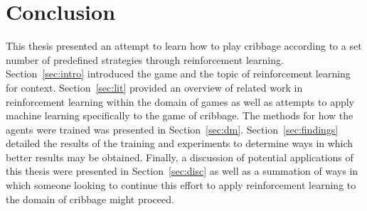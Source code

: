 \section{Conclusion}
\label{sec:conclusion}


This thesis presented an attempt to learn how to play cribbage according
to a set number of predefined strategies through reinforcement learning.
%
Section~\ref{sec:intro} introduced the game and the topic of reinforcement
learning for context.
%
Section~\ref{sec:lit} provided an overview of related work in
reinforcement learning within the domain of games
as well as attempts to apply machine learning
specifically to the game of cribbage.
%
The methods for how the agents were trained was presented in
Section~\ref{sec:dm}.
%
Section~\ref{sec:findings}
detailed the results of the training and 
experiments to determine ways in which better results may be obtained.
%
Finally,
a discussion of potential applications of this thesis
were presented in Section~\ref{sec:disc}
as well as a summation of ways in which someone looking to continue this effort
to apply reinforcement learning to the domain of cribbage might proceed.

